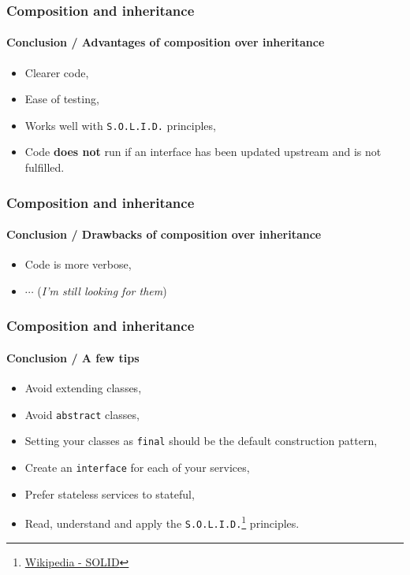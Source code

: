 \begin{frame}
    \frametitle{Composition and inheritance}
    \framesubtitle{Conclusion / Advantages of composition over inheritance}

    \begin{itemize}[<+->]
        \item Clearer code,
        \item Ease of testing,
        \item Works well with \texttt{S.O.L.I.D.} principles,
        \item Code \textbf{does not} run if an interface has been updated upstream and is not fulfilled.
    \end{itemize}
\end{frame}

\begin{frame}
    \frametitle{Composition and inheritance}
    \framesubtitle{Conclusion / Drawbacks of composition over inheritance}

    \begin{itemize}[<+->]
        \item Code is more verbose,
        \item $\cdots$ (\textit{I'm still looking for them})
    \end{itemize}
\end{frame}


\begin{frame}
    \frametitle{Composition and inheritance}
    \framesubtitle{Conclusion / A few tips}

    \begin{itemize}[<+->]
        \item Avoid extending classes,
        \item Avoid \texttt{abstract} classes,
        \item Setting your classes as \texttt{final} should be the default construction pattern,
        \item Create an \texttt{interface} for each of your services,
        \item Prefer stateless services to stateful,
        \item Read, understand and apply the \texttt{S.O.L.I.D.}\footnote{\href{https://en.wikipedia.org/wiki/SOLID}{Wikipedia - SOLID}} principles.
    \end{itemize}
\end{frame}
